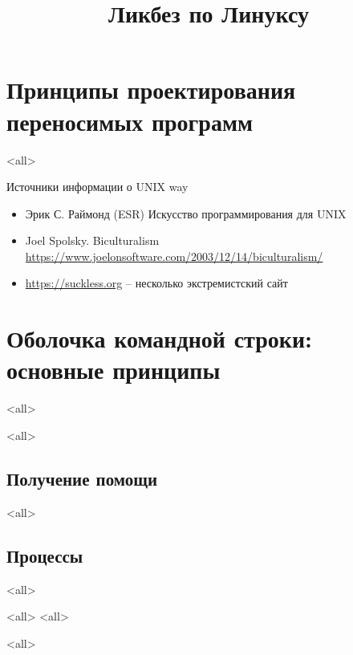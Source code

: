 

\title{Ликбез по Линуксу}



\begin{frame}
  \frametitle{}
  \titlepage
\end{frame}

\section{Принципы проектирования переносимых программ}
\mode<all>{}

\begin{frame}{Источники информации о UNIX way}
  \begin{itemize}
    \item Эрик С. Раймонд (ESR) Искусство программирования для UNIX
    \item Joel Spolsky. Biculturalism \url{https://www.joelonsoftware.com/2003/12/14/biculturalism/}
    \item \url{https://suckless.org} -- несколько экстремистский сайт
  \end{itemize}
\end{frame}

\section{Оболочка командной строки: основные принципы}

\mode<all>{}

\mode<all>{}

\subsection{Получение помощи}

\mode<all>{}

\subsection{Процессы}

\mode<all>{}

\mode<all>{}
\mode<all>{}

\mode<all>{}






